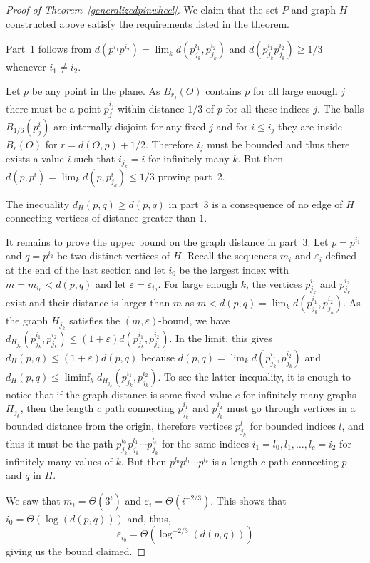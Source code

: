 \documentclass[12pt]{article}
\theoremstyle{plain}
\theoremstyle{definition}
\theoremstyle{remark}
\begin{document}
\begin{proof}[Proof of Theorem~\ref{generalizedpinwheel}]
We claim that the set $P$ and graph $H$ constructed above satisfy the requirements listed in the theorem.

Part~1 follows from $d(p^{i_1}p^{i_2})=\lim_kd(p^{i_1}_{j_k},p^{i_2}_{j_k})$ and $d(p_{j_k}^{i_1}p_{j_k}^{i_2})\ge1/3$ whenever $i_1\ne i_2$.

Let $p$ be any point in the plane. As $B_{r_j}(O)$ contains $p$ for all large enough $j$ there must be a point $p^{i_j}_j$ within distance $1/3$ of $p$ for all these indices $j$. The balls $B_{1/6}(p_j^i)$ are internally disjoint for any fixed $j$ and for $i\le i_j$ they are inside $B_r(O)$ for $r=d(O,p)+1/2$. Therefore $i_j$ must be bounded and thus there exists a value $i$ such that $i_{j_k}=i$ for infinitely many $k$. But then $d(p,p^i)=\lim_kd(p,p^i_{j_k})\le1/3$ proving part~2.

The inequality $d_H(p,q)\ge d(p,q)$ in part~3 is a consequence of no edge of $H$ connecting vertices of distance greater than $1$.

It remains to prove the upper bound on the graph distance in part~3. Let $p=p^{i_1}$ and $q=p^{i_2}$ be two distinct vertices of $H$. Recall the sequences $m_i$ and $\varepsilon_i$ defined at the end of the last section and let $i_0$ be the largest index with $m=m_{i_0}<d(p,q)$ and let $\varepsilon=\varepsilon_{i_0}$. For large enough $k$, the vertices $p_{j_k}^{i_1}$ and $p_{j_k}^{i_2}$ exist and their distance is larger than $m$ as $m<d(p,q)=\lim_kd(p^{i_1}_{j_k},p^{i_2}_{j_k})$. As the graph $H_{j_k}$ satisfies the $(m,\varepsilon)$-bound, we have $d_{H_{j_k}}(p^{i_1}_{j_k},p^{i_2}_{j_k})\le(1+\varepsilon)d(p^{i_1}_{j_k},p^{i_2}_{j_k})$. In the limit, this gives $d_H(p,q)\le(1+\varepsilon)d(p,q)$ because $d(p,q)=\lim_kd(p^{i_1}_{j_k},p^{i_2}_{j_k})$ and $d_H(p,q)\le\liminf_kd_{H_{j_k}}(p^{i_1}_{j_k},p^{i_2}_{j_k})$. To see the latter inequality, it is enough to notice that if the graph distance is some fixed value $c$ for infinitely many graphs $H_{j_k}$, then the length $c$ path connecting $p^{i_1}_{j_k}$ and $p^{i_2}_{j_k}$ must go through vertices in a bounded distance from the origin, therefore vertices $p^l_{j_k}$ for bounded indices $l$, and thus it must be the path $p^{l_0}_{j_k}p^{l_1}_{j_k}\cdots p^{l_c}_{j_k}$ for the same indices $i_1=l_0,l_1,\dots,l_c=i_2$ for infinitely many values of $k$. But then $p^{l_0}p^{l_1}\cdots p^{l_c}$ is a length $c$ path connecting $p$ and $q$ in $H$.

We saw that $m_i=\Theta(3^i)$ and $\varepsilon_i=\Theta(i^{-2/3})$. This shows that $i_0=\Theta(\log(d(p,q)))$ and, thus, $$\varepsilon_{i_0}=\Theta(\log^{-2/3}(d(p,q)))$$ giving us the bound claimed.
\end{proof}
\end{document}
